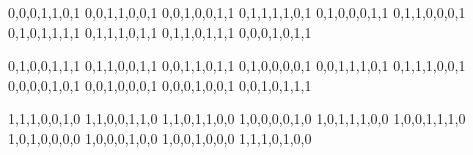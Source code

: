 %
%
%
%
%

\makeatletter

\expandafter\def\csname eanL@0\endcsname{0,0,0,1,1,0,1}
\expandafter\def\csname eanL@1\endcsname{0,0,1,1,0,0,1}
\expandafter\def\csname eanL@2\endcsname{0,0,1,0,0,1,1}
\expandafter\def\csname eanL@3\endcsname{0,1,1,1,1,0,1}
\expandafter\def\csname eanL@4\endcsname{0,1,0,0,0,1,1}
\expandafter\def\csname eanL@5\endcsname{0,1,1,0,0,0,1}
\expandafter\def\csname eanL@6\endcsname{0,1,0,1,1,1,1}
\expandafter\def\csname eanL@7\endcsname{0,1,1,1,0,1,1}
\expandafter\def\csname eanL@8\endcsname{0,1,1,0,1,1,1}
\expandafter\def\csname eanL@9\endcsname{0,0,0,1,0,1,1}

\expandafter\def\csname eanG@0\endcsname{0,1,0,0,1,1,1}
\expandafter\def\csname eanG@1\endcsname{0,1,1,0,0,1,1}
\expandafter\def\csname eanG@2\endcsname{0,0,1,1,0,1,1}
\expandafter\def\csname eanG@3\endcsname{0,1,0,0,0,0,1}
\expandafter\def\csname eanG@4\endcsname{0,0,1,1,1,0,1}
\expandafter\def\csname eanG@5\endcsname{0,1,1,1,0,0,1}
\expandafter\def\csname eanG@6\endcsname{0,0,0,0,1,0,1}
\expandafter\def\csname eanG@7\endcsname{0,0,1,0,0,0,1}
\expandafter\def\csname eanG@8\endcsname{0,0,0,1,0,0,1}
\expandafter\def\csname eanG@9\endcsname{0,0,1,0,1,1,1}

\expandafter\def\csname eanR@0\endcsname{1,1,1,0,0,1,0}
\expandafter\def\csname eanR@1\endcsname{1,1,0,0,1,1,0}
\expandafter\def\csname eanR@2\endcsname{1,1,0,1,1,0,0}
\expandafter\def\csname eanR@3\endcsname{1,0,0,0,0,1,0}
\expandafter\def\csname eanR@4\endcsname{1,0,1,1,1,0,0}
\expandafter\def\csname eanR@5\endcsname{1,0,0,1,1,1,0}
\expandafter\def\csname eanR@6\endcsname{1,0,1,0,0,0,0}
\expandafter\def\csname eanR@7\endcsname{1,0,0,0,1,0,0}
\expandafter\def\csname eanR@8\endcsname{1,0,0,1,0,0,0}
\expandafter\def\csname eanR@9\endcsname{1,1,1,0,1,0,0}

